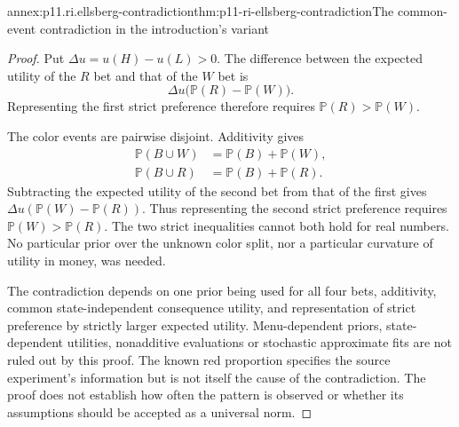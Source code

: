 \begin{annexitem}{annex:p11.ri.ellsberg-contradiction}{thm:p11-ri-ellsberg-contradiction}{The common-event contradiction in the introduction's variant}
\begin{proof}
Put \(\Delta u=u(H)-u(L)>0\). The difference between
the expected utility of the \(R\) bet and that of the \(W\)
bet is
\[
 \Delta u\bigl(\mathbb P(R)-\mathbb P(W)\bigr).
\]
Representing the first strict preference therefore requires
\(\mathbb P(R)>\mathbb P(W)\).

The color events are pairwise disjoint. Additivity gives
\[
\begin{aligned}
 \mathbb P(B\cup W)&=\mathbb P(B)+\mathbb P(W),\\
 \mathbb P(B\cup R)&=\mathbb P(B)+\mathbb P(R).
\end{aligned}
\]
Subtracting the expected utility of the second bet from that of
the first gives
\(\Delta u(\mathbb P(W)-\mathbb P(R))\). Thus representing
the second strict preference requires
\(\mathbb P(W)>\mathbb P(R)\). The two strict inequalities
cannot both hold for real numbers. No particular prior over the
unknown color split, nor a particular curvature of utility in
money, was needed.

The contradiction depends on one prior being used for all four
bets, additivity, common state-independent consequence utility,
and representation of strict preference by strictly larger
expected utility. Menu-dependent priors, state-dependent
utilities, nonadditive evaluations or stochastic approximate
fits are not ruled out by this proof. The known red proportion
specifies the source experiment's information but is not itself
the cause of the contradiction. The proof does not establish
how often the pattern is observed or whether its assumptions
should be accepted as a universal norm.
\end{proof}
\end{annexitem}

